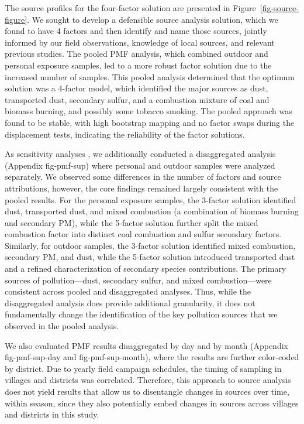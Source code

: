 \documentclass[
  letterpaper,
  DIV=11,
  numbers=noendperiod]{scrartcl}
\begin{document}
The source profiles for the four-factor solution are presented in
Figure~\ref{fig-source-figure}. We sought to develop a defensible source
analysis solution, which we found to have 4 factors and then identify
and name those sources, jointly informed by our field observations,
knowledge of local sources, and relevant previous studies. The pooled
PMF analysis, which combined outdoor and personal exposure samples, led
to a more robust factor solution due to the increased number of samples.
This pooled analysis determined that the optimum solution was a 4-factor
model, which identified the major sources as dust, transported dust,
secondary sulfur, and a combustion mixture of coal and biomass burning,
and possibly some tobacco smoking. The pooled approach was found to be
stable, with high bootstrap mapping and no factor swaps during the
displacement tests, indicating the reliability of the factor solutions.

As sensitivity analyses , we additionally conducted a
disaggregated analysis (Appendix fig-pmf-sup) where personal and outdoor
samples were analyzed separately. We observed some differences in the
number of factors and source attributions, however, the core findings
remained largely consistent with the pooled results. For the personal
exposure samples, the 3-factor solution identified dust, transported
dust, and mixed combustion (a combination of biomass burning and
secondary PM), while the 5-factor solution further split the mixed
combustion factor into distinct coal combustion and sulfur secondary
factors. Similarly, for outdoor samples, the 3-factor solution
identified mixed combustion, secondary PM, and dust, while the 5-factor
solution introduced transported dust and a refined characterization of
secondary species contributions. The primary sources of
pollution---dust, secondary sulfur, and mixed combustion---were
consistent across pooled and disaggregated analyses. Thus, while the
disaggregated analysis does provide additional granularity, it does not
fundamentally change the identification of the key pollution sources
that we observed in the pooled analysis.

We also evaluated PMF results disaggregated  by
day and by month (Appendix fig-pmf-sup-day and fig-pmf-sup-month), where
the results are further color-coded by district. Due to yearly field
campaign schedules, the timing of sampling in villages and districts was
correlated. Therefore, this approach to source analysis does not yield
results that allow us to disentangle changes in sources over time,
within season, since they also potentially embed changes in sources
across villages and districts in this study.
\end{document}
